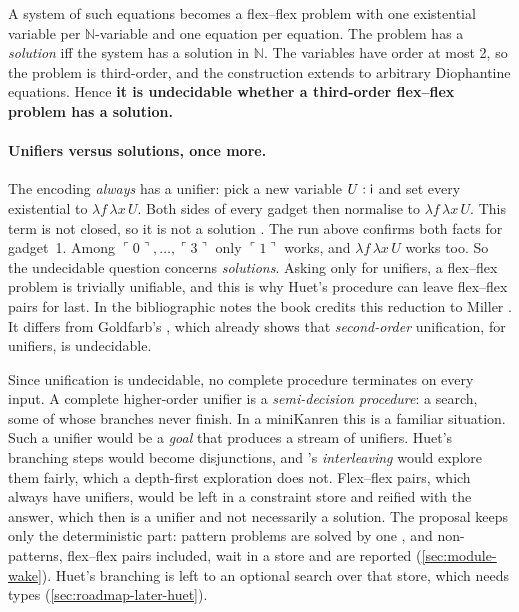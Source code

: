 {\begin{theorem}[{\book{116}}]\label{thm:lambda-hilbert}
A system of such equations becomes a flex–flex problem with one existential variable per
$\mathbb N$-variable and one equation per equation. The problem has a \emph{solution} iff the system has
a solution in $\mathbb N$. The variables have order at most 2, so the problem is third-order, and the
construction extends to arbitrary Diophantine equations. Hence \textbf{it is undecidable whether a
third-order flex–flex problem has a solution.}
\end{theorem}

\paragraph{Unifiers versus solutions, once more.} The encoding \emph{always} has a unifier: pick a new
variable $U:\mathsf{i}$ and set every existential to $\lambda f\,\lambda x\,U$. Both sides of every gadget then
normalise to $\lambda f\,\lambda x\,U$. This term is not closed, so it is not a solution . The run
above confirms both facts for gadget~1. Among $\ulcorner 0\urcorner,\dots,\ulcorner 3\urcorner$ only
$\ulcorner 1\urcorner$ works, and $\lambda f\,\lambda x\,U$ works too. So the undecidable question concerns
\emph{solutions}. Asking only for unifiers, a flex–flex problem is trivially unifiable, and this is why
Huet's procedure can leave flex–flex pairs for last. In the bibliographic notes  the book
credits this reduction to Miller \cite{Miller1992}. It differs from Goldfarb's \cite{Goldfarb1981}, which
already shows that \emph{second-order} unification, for unifiers, is undecidable.

\begin{kanren}
Since unification is undecidable, no complete procedure terminates on every input. A complete
higher-order unifier is a \emph{semi-decision procedure}: a search, some of whose branches never
finish. In a miniKanren this is a familiar situation. Such a unifier would be a \emph{goal} that produces a
stream of unifiers. Huet's branching steps would become disjunctions, and \micro's \emph{interleaving}
 would explore them fairly, which a depth-first exploration does not. Flex–flex pairs, which always
have unifiers, would be left in a constraint store and reified with the answer, which then is a unifier and
not necessarily a solution. The proposal keeps only the deterministic part: pattern problems are solved by
one , and non-patterns, flex–flex pairs included, wait in a store and are reported
(\cref{sec:module-wake}). Huet's branching is left to an optional search over that store, which needs
types (\cref{sec:roadmap-later-huet}).
\end{kanren}

}
